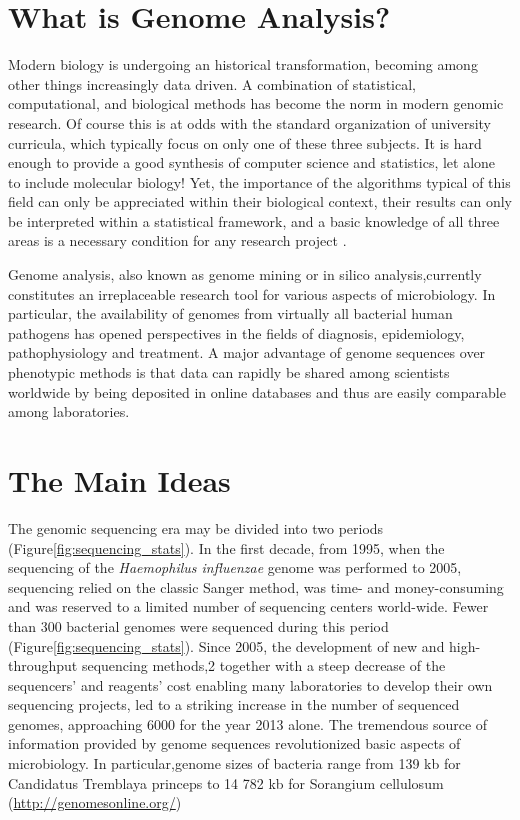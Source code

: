 \section{What is Genome Analysis?} 
Modern biology is undergoing an historical transformation, becoming among other things increasingly data driven. A combination of statistical, computational, and biological methods has become the norm in modern genomic research. Of course this is at odds with the standard organization of university curricula, which typically focus on only one of these three subjects. It is hard enough to provide a good synthesis of computer science and statistics, let alone
to include molecular biology! Yet, the importance of the algorithms typical of this field can only be appreciated within their biological context, their results
can only be interpreted within a statistical framework, and a basic knowledge of all three areas is a necessary condition for any research project \cite{compgenome}.

Genome analysis, also known as genome mining or in silico analysis,currently constitutes an irreplaceable research tool for various aspects of microbiology\cite{ray2003}. In particular, the availability of genomes from virtually all bacterial human pathogens has opened perspectives in the fields
of diagnosis, epidemiology, pathophysiology and treatment.
A major advantage of genome sequences over phenotypic methods
is that data can rapidly be shared among scientists worldwide by being deposited in online databases and thus are easily comparable among laboratories.


\section{The Main Ideas}
The genomic sequencing era may be divided into two periods (Figure\ref{fig:sequencing_stats}). In the first decade, from 1995, when the sequencing of the \textit{Haemophilus influenzae} genome was performed \cite{ray2003} to 2005, sequencing relied on the classic Sanger method, was time- and money-consuming and was reserved to a limited number of sequencing centers world-wide. Fewer than 300 bacterial genomes were sequenced during this period (Figure\ref{fig:sequencing_stats}). Since 2005, the development of new and high-throughput sequencing methods,2 together with a steep decrease of the sequencers’ and reagents’ cost enabling many laboratories to develop their own sequencing projects, led to a striking increase in the number of sequenced genomes, approaching 6000 for the year 2013 alone. The tremendous source of information provided by genome sequences revolutionized basic aspects of microbiology. In particular,genome sizes of bacteria range from 139 kb for Candidatus Tremblaya princeps to 14 782 kb for Sorangium cellulosum (\url{http://genomesonline.org/})  \cite{ray2003}


